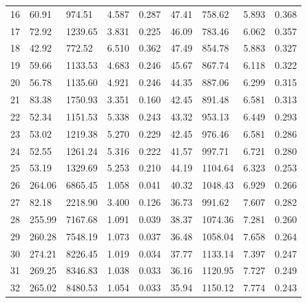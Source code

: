 \documentclass[12pt]{article}
\begin{document}
\begin{table}
\begin{tabular}{| l | l l l l | l l l l |}
	16 & 60.91 & 974.51 & 4.587 & 0.287 & 47.41 & 758.62 & 5.893 & 0.368 \\
	17 & 72.92 & 1239.65 & 3.831 & 0.225 & 46.09 & 783.46 & 6.062 & 0.357 \\
	18 & 42.92 & 772.52 & 6.510 & 0.362 & 47.49 & 854.78 & 5.883 & 0.327 \\
	19 & 59.66 & 1133.53 & 4.683 & 0.246 & 45.67 & 867.74 & 6.118 & 0.322 \\
	20 & 56.78 & 1135.60 & 4.921 & 0.246 & 44.35 & 887.06 & 6.299 & 0.315 \\
	21 & 83.38 & 1750.93 & 3.351 & 0.160 & 42.45 & 891.48 & 6.581 & 0.313 \\
	22 & 52.34 & 1151.53 & 5.338 & 0.243 & 43.32 & 953.13 & 6.449 & 0.293 \\
	23 & 53.02 & 1219.38 & 5.270 & 0.229 & 42.45 & 976.46 & 6.581 & 0.286 \\
	24 & 52.55 & 1261.24 & 5.316 & 0.222 & 41.57 & 997.71 & 6.721 & 0.280 \\
	25 & 53.19 & 1329.69 & 5.253 & 0.210 & 44.19 & 1104.64 & 6.323 & 0.253 \\
	26 & 264.06 & 6865.45 & 1.058 & 0.041 & 40.32 & 1048.43 & 6.929 & 0.266 \\
	27 & 82.18 & 2218.90 & 3.400 & 0.126 & 36.73 & 991.62 & 7.607 & 0.282 \\
	28 & 255.99 & 7167.68 & 1.091 & 0.039 & 38.37 & 1074.36 & 7.281 & 0.260 \\
	29 & 260.28 & 7548.19 & 1.073 & 0.037 & 36.48 & 1058.04 & 7.658 & 0.264 \\
	30 & 274.21 & 8226.45 & 1.019 & 0.034 & 37.77 & 1133.14 & 7.397 & 0.247 \\
	31 & 269.25 & 8346.83 & 1.038 & 0.033 & 36.16 & 1120.95 & 7.727 & 0.249 \\
	32 & 265.02 & 8480.53 & 1.054 & 0.033 & 35.94 & 1150.12 & 7.774 & 0.243 \\
	\hline
\end{tabular}
\end{table}
\end{document}
